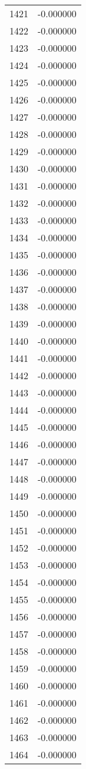 \documentclass[12pt]{article}
\begin{document}
\begin{longtable}{@{}cc@{}}
1421 & -0.000000 \\
1422 & -0.000000 \\
1423 & -0.000000 \\
1424 & -0.000000 \\
1425 & -0.000000 \\
1426 & -0.000000 \\
1427 & -0.000000 \\
1428 & -0.000000 \\
1429 & -0.000000 \\
1430 & -0.000000 \\
1431 & -0.000000 \\
1432 & -0.000000 \\
1433 & -0.000000 \\
1434 & -0.000000 \\
1435 & -0.000000 \\
1436 & -0.000000 \\
1437 & -0.000000 \\
1438 & -0.000000 \\
1439 & -0.000000 \\
1440 & -0.000000 \\
1441 & -0.000000 \\
1442 & -0.000000 \\
1443 & -0.000000 \\
1444 & -0.000000 \\
1445 & -0.000000 \\
1446 & -0.000000 \\
1447 & -0.000000 \\
1448 & -0.000000 \\
1449 & -0.000000 \\
1450 & -0.000000 \\
1451 & -0.000000 \\
1452 & -0.000000 \\
1453 & -0.000000 \\
1454 & -0.000000 \\
1455 & -0.000000 \\
1456 & -0.000000 \\
1457 & -0.000000 \\
1458 & -0.000000 \\
1459 & -0.000000 \\
1460 & -0.000000 \\
1461 & -0.000000 \\
1462 & -0.000000 \\
1463 & -0.000000 \\
1464 & -0.000000 \\

\end{longtable}
\end{document}
